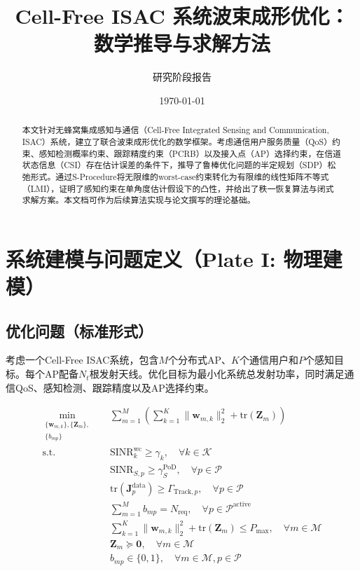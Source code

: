 \documentclass[12pt,a4paper]{article}
\title{\textbf{Cell-Free ISAC 系统波束成形优化：\\数学推导与求解方法}}
\author{研究阶段报告}
\date{\today}
\newcommand{\vect}[1]{\mathbf{#1}}
\newcommand{\mat}[1]{\mathbf{#1}}
\newcommand{\norm}[1]{\|#1\|_2}
\newcommand{\tr}{\text{tr}}
\begin{document}
\maketitle

\begin{abstract}
本文针对无蜂窝集成感知与通信（Cell-Free Integrated Sensing and Communication, ISAC）系统，建立了联合波束成形优化的数学框架。考虑通信用户服务质量（QoS）约束、感知检测概率约束、跟踪精度约束（PCRB）以及接入点（AP）选择约束，在信道状态信息（CSI）存在估计误差的条件下，推导了鲁棒优化问题的半定规划（SDP）松弛形式。通过S-Procedure将无限维的worst-case约束转化为有限维的线性矩阵不等式（LMI），证明了感知约束在单角度估计假设下的凸性，并给出了秩一恢复算法与闭式求解方案。本文档可作为后续算法实现与论文撰写的理论基础。
\end{abstract}

\tableofcontents
\newpage

\section{系统建模与问题定义（Plate I: 物理建模）}

\subsection{优化问题（标准形式）}

考虑一个Cell-Free ISAC系统，包含$M$个分布式AP、$K$个通信用户和$P$个感知目标。每个AP配备$N_t$根发射天线。优化目标为最小化系统总发射功率，同时满足通信QoS、感知检测、跟踪精度以及AP选择约束。

\begin{align}
\min_{\substack{\{\vect{w}_{m,k}\}, \{\mat{Z}_m\}, \\ \{b_{mp}\}}} \quad & \sum_{m=1}^{M} \left( \sum_{k=1}^{K} \norm{\vect{w}_{m,k}}^2 + \tr(\mat{Z}_m) \right) \tag{P1} \\
\text{s.t.} \quad & \text{SINR}_k^{\text{wc}} \geq \gamma_k, \quad \forall k \in \mathcal{K} \label{eq:sinr_comm} \\
& \text{SINR}_{S,p} \geq \gamma_S^{\text{PoD}}, \quad \forall p \in \mathcal{P} \label{eq:sinr_sens} \\
& \tr(\mat{J}_p^{\text{data}}) \geq \Gamma_{\text{Track}, p}, \quad \forall p \in \mathcal{P} \label{eq:pcrb} \\
& \sum_{m=1}^{M} b_{mp} = N_{\text{req}}, \quad \forall p \in \mathcal{P}^{\text{active}} \label{eq:ap_select} \\
& \sum_{k=1}^{K} \norm{\vect{w}_{m,k}}^2 + \tr(\mat{Z}_m) \leq P_{\max}, \quad \forall m \in \mathcal{M} \label{eq:power} \\
& \mat{Z}_m \succeq \mat{0}, \quad \forall m \in \mathcal{M} \label{eq:psd} \\
& b_{mp} \in \{0, 1\}, \quad \forall m \in \mathcal{M}, p \in \mathcal{P} \label{eq:binary}
\end{align}
\end{document}
